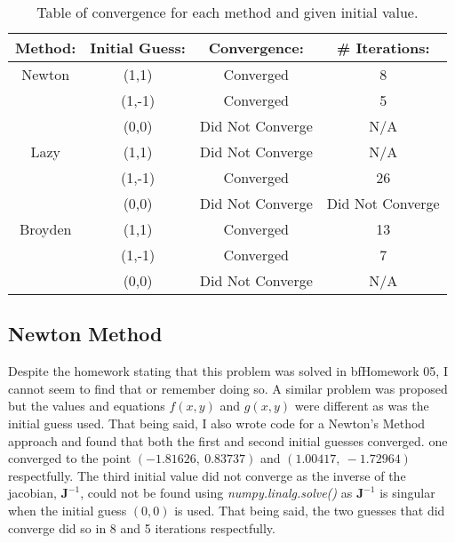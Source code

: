 \documentclass{article}
\begin{document}
\begin{table}[h!]
    \centering
    \begin{tabular}{|c|c|c|c|}
        \hline
        Method: & Initial Guess: & Convergence: & \# Iterations: \\
        \hline
        Newton & (1,1) & Converged & 8 \\
        & (1,-1) & Converged & 5 \\
        & (0,0) & Did Not Converge & N/A \\
        \hline
        Lazy & (1,1) & Did Not Converge & N/A \\
        & (1,-1) & Converged & 26 \\
        & (0,0) & Did Not Converge & Did Not Converge \\
        \hline
        Broyden & (1,1) & Converged & 13 \\
        & (1,-1) & Converged & 7 \\
        & (0,0) & Did Not Converge & N/A \\
        \hline
    \end{tabular}
    \caption{Table of convergence for each method and given initial value.}
    \label{tab:my_label}
\end{table}

\subsection{Newton Method}
Despite the homework stating that this problem was solved in \textbf{}bf{Homework 05}, I cannot seem to find that or remember doing so. A similar problem was proposed but the values and equations \(f(x,y)\) and \(g(x,y)\) were different as was the initial guess used. That being said, I also wrote code for a Newton's Method approach and found that both the first and second initial guesses converged. one converged to the point \((-1.81626,\ 0.83737)\) and \((1.00417,\ -1.72964)\) respectfully. The third initial value did not converge as the inverse of the jacobian, \(\mathbf{J}^{-1}\), could not be found using \textit{numpy.linalg.solve()} as \(\mathbf{J}^{-1}\) is singular when the initial guess \((0,0)\) is used. That being said, the two guesses that did converge did so in 8 and 5 iterations respectfully.
\end{document}
